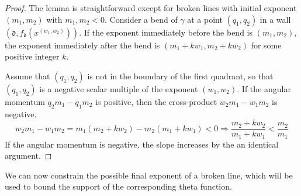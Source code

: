 \documentclass[11pt]{amsart}
\theoremstyle{remark}
\numberwithin{equation}{section}
\newcommand{\fd}{\mathfrak{d}}
\begin{document}
\begin{proof}
The lemma is straightforward except for broken lines with initial exponent $(m_1,m_2)$ with $m_1,m_2<0$.
Consider a bend of $\gamma$ at a point $(q_1,q_2)$ in a wall $(\fd,f_{\fd}(x^{(w_1,w_2)}))$.  If the exponent immediately before the bend is $(m_1,m_2)$, the exponent immediately after the bend is $(m_1+kw_1,m_2+kw_2)$ for some positive integer $k$.  

Assume that $(q_1,q_2)$ is not in the boundary of the first quadrant, so that $(q_1,q_2)$ is a negative scalar multiple of the exponent $(w_1,w_2)$. If the angular momentum $q_2m_1-q_1m_2$ is positive, then the cross-product $w_2m_1-w_1m_2$ is negative. 
\[ w_2m_1-w_1m_2=m_1(m_2+kw_2)-m_2(m_1+kw_1)<0 \Rightarrow \frac{m_2+kw_2}{m_1+kw_1} < \frac{m_2}{m_1}\]
If the angular momentum is negative, the slope increases by the an identical argument.
\end{proof}

We can now constrain the possible final exponent of a broken line, which will be used to bound the support of the corresponding theta function.
\end{document}
